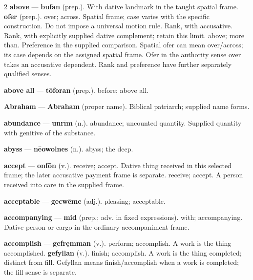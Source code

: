 \begin{multicols}{2}
\textbf{above} — \textbf{bufan} (prep.). With dative landmark in the taught spatial frame. \textbf{ofer} (prep.). over; across. Spatial frame; case varies with the specific construction. Do not impose a universal motion rule. Rank, with accusative. Rank, with explicitly supplied dative complement; retain this limit. above; more than. Preference in the supplied comparison. Spatial ofer can mean over/across; its case depends on the assigned spatial frame. Ofer in the authority sense over takes an accusative dependent. Rank and preference have further separately qualified senses.\par
\textbf{above all} — \textbf{tōforan} (prep.). before; above all.\par
\textbf{Abraham} — \textbf{Abraham} (proper name). Biblical patriarch; supplied name forms.\par
\textbf{abundance} — \textbf{unrīm} (n.). abundance; uncounted quantity. Supplied quantity with genitive of the substance.\par
\textbf{abyss} — \textbf{nēowolnes} (n.). abyss; the deep.\par
\textbf{accept} — \textbf{onfōn} (v.). receive; accept. Dative thing received in this selected frame; the later accusative payment frame is separate. receive; accept. A person received into care in the supplied frame.\par
\textbf{acceptable} — \textbf{gecwēme} (adj.). pleasing; acceptable.\par
\textbf{accompanying} — \textbf{mid} (prep.; adv. in fixed expressions). with; accompanying. Dative person or cargo in the ordinary accompaniment frame.\par
\textbf{accomplish} — \textbf{gefręmman} (v.). perform; accomplish. A work is the thing accomplished. \textbf{gefyllan} (v.). finish; accomplish. A work is the thing completed; distinct from fill. Gefyllan means finish/accomplish when a work is completed; the fill sense is separate.\par

\end{multicols}
